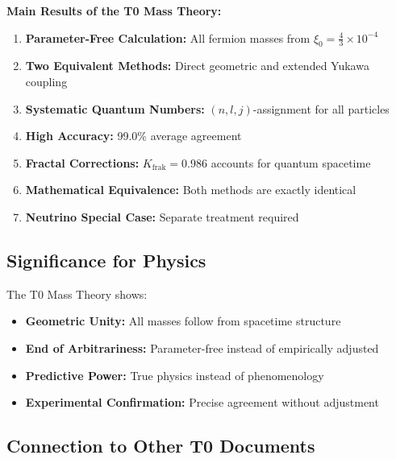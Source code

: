 \documentclass[12pt,a4paper]{article}
\begin{document}
	\begin{keyresult}
		\textbf{Main Results of the T0 Mass Theory:}
		
		\begin{enumerate}
			\item \textbf{Parameter-Free Calculation:} All fermion masses from $\xi_0 = \frac{4}{3} \times 10^{-4}$
			
			\item \textbf{Two Equivalent Methods:} Direct geometric and extended Yukawa coupling
			
			\item \textbf{Systematic Quantum Numbers:} $(n,l,j)$-assignment for all particles
			
			\item \textbf{High Accuracy:} 99.0\% average agreement
			
			\item \textbf{Fractal Corrections:} $K_{\text{frak}} = 0.986$ accounts for quantum spacetime
			
			\item \textbf{Mathematical Equivalence:} Both methods are exactly identical
			
			\item \textbf{Neutrino Special Case:} Separate treatment required
		\end{enumerate}
	\end{keyresult}
	
	\subsection{Significance for Physics}
	
	The T0 Mass Theory shows:
	\begin{itemize}
		\item \textbf{Geometric Unity:} All masses follow from spacetime structure
		\item \textbf{End of Arbitrariness:} Parameter-free instead of empirically adjusted
		\item \textbf{Predictive Power:} True physics instead of phenomenology
		\item \textbf{Experimental Confirmation:} Precise agreement without adjustment
	\end{itemize}
	
	\subsection{Connection to Other T0 Documents}
	
\end{document}
